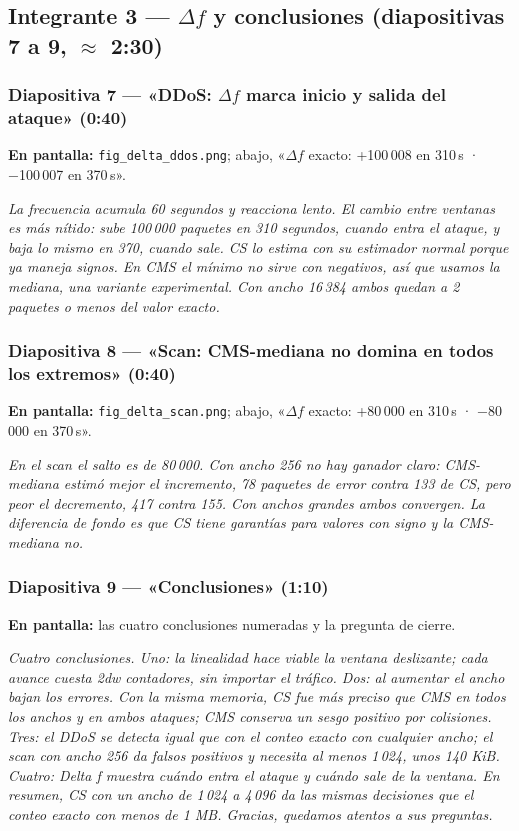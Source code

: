 \documentclass[11pt]{article}
\newcommand{\code}[1]{\texttt{#1}}
\newcommand{\decir}[1]{%
  \par\noindent\colorbox{guion}{\parbox{\dimexpr\linewidth-2\fboxsep}{\small\textit{#1}}}\par\medskip}
\begin{document}
\subsection{Integrante 3 — $\Delta f$ y conclusiones (diapositivas 7 a 9, $\approx$ 2:30)}

\subsubsection*{Diapositiva 7 — «DDoS: $\Delta f$ marca inicio y salida del ataque» (0:40)}
\textbf{En pantalla:} \code{fig\_delta\_ddos.png}; abajo, «$\Delta f$ exacto: +100\,008 en 310\,s · −100\,007 en 370\,s».
\decir{La frecuencia acumula 60 segundos y reacciona lento. El cambio entre ventanas es más nítido: sube 100\,000 paquetes en 310 segundos, cuando entra el ataque, y baja lo mismo en 370, cuando sale. CS lo estima con su estimador normal porque ya maneja signos. En CMS el mínimo no sirve con negativos, así que usamos la mediana, una variante experimental. Con ancho 16\,384 ambos quedan a 2 paquetes o menos del valor exacto.}

\subsubsection*{Diapositiva 8 — «Scan: CMS-mediana no domina en todos los extremos» (0:40)}
\textbf{En pantalla:} \code{fig\_delta\_scan.png}; abajo, «$\Delta f$ exacto: +80\,000 en 310\,s · −80\,000 en 370\,s».
\decir{En el scan el salto es de 80\,000. Con ancho 256 no hay ganador claro: CMS-mediana estimó mejor el incremento, 78 paquetes de error contra 133 de CS, pero peor el decremento, 417 contra 155. Con anchos grandes ambos convergen. La diferencia de fondo es que CS tiene garantías para valores con signo y la CMS-mediana no.}

\subsubsection*{Diapositiva 9 — «Conclusiones» (1:10)}
\textbf{En pantalla:} las cuatro conclusiones numeradas y la pregunta de cierre.
\decir{Cuatro conclusiones. Uno: la linealidad hace viable la ventana deslizante; cada avance cuesta 2dw contadores, sin importar el tráfico. Dos: al aumentar el ancho bajan los errores. Con la misma memoria, CS fue más preciso que CMS en todos los anchos y en ambos ataques; CMS conserva un sesgo positivo por colisiones. Tres: el DDoS se detecta igual que con el conteo exacto con cualquier ancho; el scan con ancho 256 da falsos positivos y necesita al menos 1\,024, unos 140 KiB. Cuatro: Delta f muestra cuándo entra el ataque y cuándo sale de la ventana. En resumen, CS con un ancho de 1\,024 a 4\,096 da las mismas decisiones que el conteo exacto con menos de 1 MB. Gracias, quedamos atentos a sus preguntas.}
\end{document}
